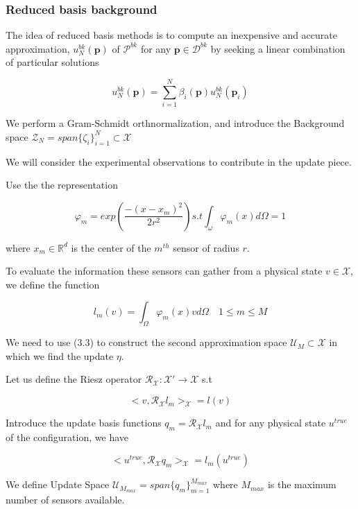 \documentclass[a4paper,10pt]{beamer}
\numberwithin{equation}{section}
\begin{document}
\begin{frame}
\frametitle{Reduced basis background}


The idea of reduced basis methods is to compute an inexpensive and accurate approximation, $u^{bk}_N(\textbf{p})$ of $\mathcal{P}^{bk}$ for any $\textbf{p} \in \mathcal{D}^{bk}$ by seeking a linear combination of particular solutions

\begin{equation}
u^{bk}_N(\textbf{p}) = \sum^{N}_{i=1}\beta_i(\textbf{p}) u^{bk}_N(\textbf{p}_i)
\end{equation}

We perform a Gram-Schmidt orthnormalization, and introduce the Background space $\mathcal{Z}_N = span\{\zeta_i\}^{N}_{i=1} \subset \mathcal{X}$ 

\end{frame}

\begin{frame}


We will consider the experimental observations to contribute in the update piece.

Use the the representation

\begin{equation}
\varphi_m = exp\left( \frac{-(x - x_m)^2}{2r^2} \right) s.t \int_{\omega} \varphi_m(x) d \Omega =1
\end{equation}

where $x_m \in \mathbb{R}^d$ is the center of the $m^{th}$ sensor of radius $r$.

To evaluate the information these sensors can gather from a physical state $v \in \mathcal{X}$, we define the function

\begin{equation}
l_m(v) = \int_{\Omega}  \varphi_m(x) v d \Omega \quad 1 \leq m \leq M
\end{equation}


\end{frame}

\begin{frame}
We need to use (3.3) to construct the second approximation space $\mathcal{U}_M
\subset\mathcal{X}$ in which we find the update $\eta$.

Let  us define the Riesz operator $\mathcal{R}_{\mathcal{X}}: \mathcal{X}' \rightarrow \mathcal{X}$ s.t

\begin{equation}
<v,\mathcal{R}_{\mathcal{X}} l_m>_{\mathcal{X}} = l(v)
\end{equation}

Introduce the update basis functions $q_m = \mathcal{R}_{\mathcal{X}} l_m$ and for any physical state $u^{true}$ of the configuration, we have

\begin{equation}
<u^{true},\mathcal{R}_{\mathcal{X}} q_m>_{\mathcal{X}} = l_m(u^{true})
\end{equation}

We define Update Space $\mathcal{U}_{M_{max}} = span \{q_m \}^{M_{max}}_{m=1}$ where $M_{max}$ is the maximum number of sensors available.

\end{frame}
\end{document}
